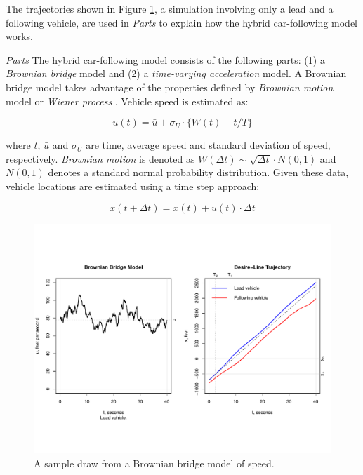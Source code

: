 \documentclass[Proceedings]{ascelike}
\begin{document}
The trajectories shown in Figure \ref{bbmodel}, a simulation involving only a lead and a following vehicle, are used in  \emph{Parts} to explain how the hybrid car-following model works.

\vspace{0.1in}
\noindent \emph{\underline{Parts} }
 The  hybrid car-following model consists of the following parts: (1)  a \emph{Brownian bridge} model and (2) a \emph{time-varying acceleration} model. A Brownian bridge model  takes advantage of the properties defined by \emph{Brownian motion} model or  \emph{Wiener process} \cite{iacus}. Vehicle speed is estimated as:

\begin {equation}
u(t)  = \bar{u} + \sigma_U \cdot \big\{ W(t) - t/T \big\} \label{eq:eq1}
\end{equation}

\noindent where $t$, $\bar{u}$ and $\sigma_U$ are time, average speed and standard deviation of speed, respectively. \emph{Brownian motion} is denoted as $W(\Delta t) \sim \sqrt{\Delta t} \cdot N(0,1)$ and $N(0,1)$ denotes a standard normal probability distribution.  Given these data, vehicle locations are estimated using a time step approach:

\begin {equation}
x(t + \Delta t)  = x(t) + u(t) \cdot \Delta t  \label{eq:eq2}
\end{equation}

\begin{figure}
\centering
\includegraphics[width = 5.5in]{Rplot03.pdf}
\caption{A sample draw from a Brownian bridge model of speed. }
\label{bbmodel}
\end{figure}
\end{document}
